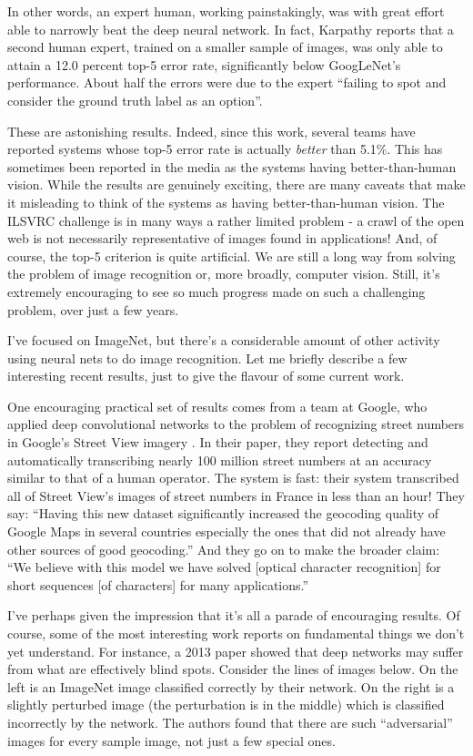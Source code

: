 In other words, an expert human, working painstakingly, was with great effort able to narrowly beat the deep neural network. In fact, Karpathy reports that a second human expert, trained on a smaller sample of images, was only able to attain a 12.0 percent top-5 error rate, significantly below GoogLeNet's performance. About half the errors were due to the expert ``failing to spot and consider the ground truth label as an option''.

These are astonishing results. Indeed, since this work, several teams have reported systems whose top-5 error rate is actually \textit{better} than 5.1\%. This has sometimes been reported in the media as the systems having better-than-human vision. While the results are genuinely exciting, there are many caveats that make it misleading to think of the systems as having better-than-human vision. The ILSVRC challenge is in many ways a rather limited problem - a crawl of the open web is not necessarily representative of images found in applications! And, of course, the top-5 criterion is quite artificial. We are still a long way from solving the problem of image recognition or, more broadly, computer vision. Still, it's extremely encouraging to see so much progress made on such a challenging problem, over just a few years.

 I've focused on ImageNet, but there's a considerable amount of other activity using neural nets to do image recognition. Let me briefly describe a few interesting recent results, just to give the flavour of some current work.

One encouraging practical set of results comes from a team at Google, who applied deep convolutional networks to the problem of recognizing street numbers in Google's Street View imagery \cite{Goodfellow2014MultidigitNR}. In their paper, they report detecting and automatically transcribing nearly 100 million street numbers at an accuracy similar to that of a human operator. The system is fast: their system transcribed all of Street View's images of street numbers in France in less than an hour! They say: ``Having this new dataset significantly increased the geocoding quality of Google Maps in several countries especially the ones that did not already have other sources of good geocoding.'' And they go on to make the broader claim: ``We believe with this model we have solved [optical character recognition] for short sequences [of characters] for many applications.''

I've perhaps given the impression that it's all a parade of encouraging results. Of course, some of the most interesting work reports on fundamental things we don't yet understand. For instance, a 2013 paper \cite{Szegedy2014IntriguingPO} showed that deep networks may suffer from what are effectively blind spots. Consider the lines of images below. On the left is an ImageNet image classified correctly by their network. On the right is a slightly perturbed image (the perturbation is in the middle) which is classified incorrectly by the network. The authors found that there are such ``adversarial'' images for every sample image, not just a few special ones.

